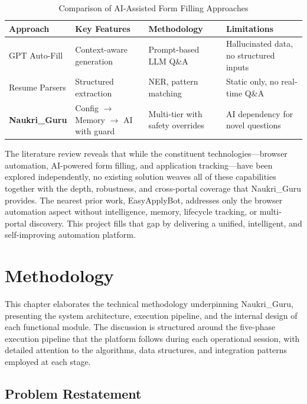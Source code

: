 \documentclass[12pt, a4paper, oneside]{report}
\begin{document}
\begin{table}[H]
\centering
\caption{Comparison of AI-Assisted Form Filling Approaches}
\label{tab:cat-c-comparison}
\small
\begin{tabularx}{\textwidth}{|l|X|X|X|}
\hline
\textbf{Approach} & \textbf{Key Features} & \textbf{Methodology} & \textbf{Limitations} \\
\hline
GPT Auto-Fill \cite{ref8} & Context-aware generation & Prompt-based LLM Q\&A & Hallucinated data, no structured inputs \\
\hline
Resume Parsers \cite{ref9} & Structured extraction & NER, pattern matching & Static only, no real-time Q\&A \\
\hline
\textbf{Naukri\_Guru} & Config $\to$ Memory $\to$ AI with guard & Multi-tier with safety overrides & AI dependency for novel questions \\
\hline
\end{tabularx}
\end{table}

The literature review reveals that while the constituent technologies---browser automation, AI-powered form filling, and application tracking---have been explored independently, no existing solution weaves all of these capabilities together with the depth, robustness, and cross-portal coverage that Naukri\_Guru provides. The nearest prior work, EasyApplyBot, addresses only the browser automation aspect without intelligence, memory, lifecycle tracking, or multi-portal discovery. This project fills that gap by delivering a unified, intelligent, and self-improving automation platform.


\chapter{Methodology}
\label{chap:methodology}

This chapter elaborates the technical methodology underpinning Naukri\_Guru, presenting the system architecture, execution pipeline, and the internal design of each functional module. The discussion is structured around the five-phase execution pipeline that the platform follows during each operational session, with detailed attention to the algorithms, data structures, and integration patterns employed at each stage.

\section{Problem Restatement}
\label{sec:problem-restatement}
\end{document}

